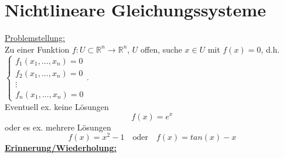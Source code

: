 \documentclass[12pt]{article}
\theoremstyle{break}
\begin{document}
\section{Nichtlineare Gleichungssysteme}
\underline{Problemstellung:}\\
Zu einer Funktion $f: U \subset \mathbb{R}^n \rightarrow \mathbb{R}^n$, $U$ offen, suche $x \in U$ mit $f(x) = 0$, d.h. $\left\{ \begin{matrix} f_1(x_1, ..., x_n) = 0 \\ f_2(x_1, ..., x_n) = 0 \\ \vdots \\ f_n(x_1, ...,x_n) = 0 \end{matrix} \right.$.\\
Eventuell ex. keine Lösungen
$$f(x) = e^x$$
oder es ex. mehrere Lösungen
$$f(x) = x^2-1 \quad \text{oder} \quad f(x) = tan(x) - x$$
%
\underline{\textbf{Erinnerung/Wiederholung:}}
%
\end{document}

